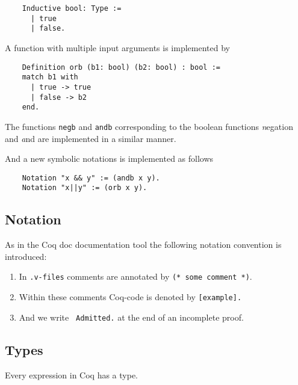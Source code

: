     \label{Def:booleans}
    \begin{lstlisting}    
    Inductive bool: Type :=
      | true
      | false.
    \end{lstlisting}
    
    A function with multiple input arguments is implemented by
    \begin{lstlisting}
    Definition orb (b1: bool) (b2: bool) : bool :=
    match b1 with
	  | true -> true
	  | false -> b2
    end.
    \end{lstlisting}
    
    The functions \lstinline!negb! and \lstinline!andb! corresponding to the boolean functions {\emph negation} and {\emph and} are implemented in a similar manner.
     
    And a new symbolic notations is implemented as follows
    \begin{lstlisting}
    Notation "x && y" := (andb x y).
    Notation "x||y" := (orb x y).
    \end{lstlisting}
    
     
\subsection{Notation}
    As in the Coq doc documentation tool the following notation convention is introduced:
     
    \begin{enumerate}
     \item In \texttt{.v-files} comments are annotated by \lstinline!(* some comment *)!. 
     \item Within these comments Coq-code is denoted by \lstinline![example].! 
     \item And we write \lstinline! Admitted.! at the end of an incomplete proof.    
     \end{enumerate}
     
     
\subsection{Types}
     Every expression in Coq has a type.
   
